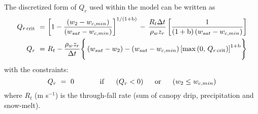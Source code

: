 The discretized form of $Q_r$ used within the model can be written as
%
%
\begin{subequations}
\begin{align}
\label{qrc}
Q_{r\,{\rm crit}} \,\,=\,\, &
{\left[1 - {\left(w_2-w_{c,min}\right)\over 
\left(w_{sat}-w_{c,min}\right)}\right]}^{1/(1+{\rm b})}
\,-\,
{R_t \Delta t \over \rho_w z_r}
\left[{ 1\over
(1+{\rm b})\left(w_{sat}-w_{c,min}\right)
}\right]
\\
\label{qr}
Q_r \,\,=\,\, & R_t - {\rho_w z_r \over\Delta t}
\Biggr\lbrace
\left(w_{sat}-w_2\right)-
\left(w_{sat}-w_{c,min}\right) 
{\left[{\rm max}\left(0,\,Q_{r\,{\rm crit}}\right)\right]}^{1+{\rm b}}
\Biggr\rbrace
\end{align}
\end{subequations}
%
with the constraints:
%
\begin{equation}
\label{qrz}
Q_r \,\,=\,\, 0
\hskip.5in
{\rm if}\hskip.2in
\left(Q_r < 0 \right) 
\hskip.2in {\rm or}\hskip.2in 
\left(w_2 \leq w_{c,min}\right) 
\end{equation}
%
where $R_t$
(m s$^{−1}$) is the through-fall rate (sum of canopy drip, precipitation
and snow-melt). 

